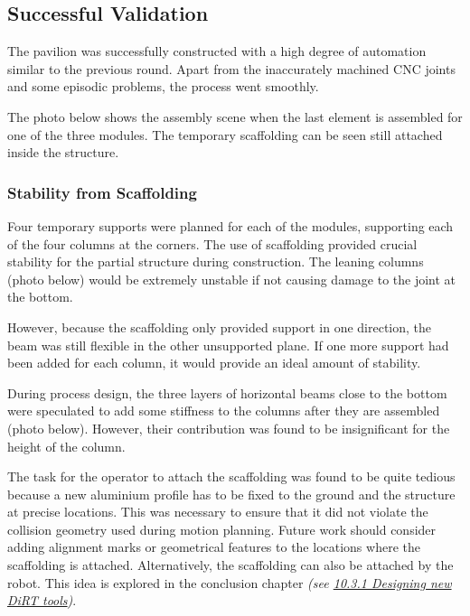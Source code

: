 


\subsection{Successful Validation}
\label{subsection:exploration-5-successful-validation}

The pavilion was successfully constructed with a high degree of automation similar to the previous round. Apart from the inaccurately machined CNC joints and some episodic problems, the process went smoothly. 

The photo below shows the assembly scene when the last element is assembled for one of the three modules. The temporary scaffolding can be seen still attached inside the structure. 




\subsubsection{Stability from Scaffolding}
\label{subsubsection:exploration-5-stability-from-scaffolding}

Four temporary supports were planned for each of the modules, supporting each of the four columns at the corners. The use of scaffolding provided crucial stability for the partial structure during construction. The leaning columns (photo below) would be extremely unstable if not causing damage to the joint at the bottom. 

However, because the scaffolding only provided support in one direction, the beam was still flexible in the other unsupported plane. If one more support had been added for each column, it would provide an ideal amount of stability. 

During process design, the three layers of horizontal beams close to the bottom were speculated to add some stiffness to the columns after they are assembled (photo below). However, their contribution was found to be insignificant for the height of the column. 




The task for the operator to attach the scaffolding was found to be quite tedious because a new aluminium profile has to be fixed to the ground and the structure at precise locations. This was necessary to ensure that it did not violate the collision geometry used during motion planning. Future work should consider adding alignment  marks or geometrical features to the locations where the scaffolding is attached. Alternatively, the scaffolding can also be attached by the robot. This idea is explored in the conclusion chapter \textit{(see \ul{10.3.1 Designing new DiRT tools})}.

